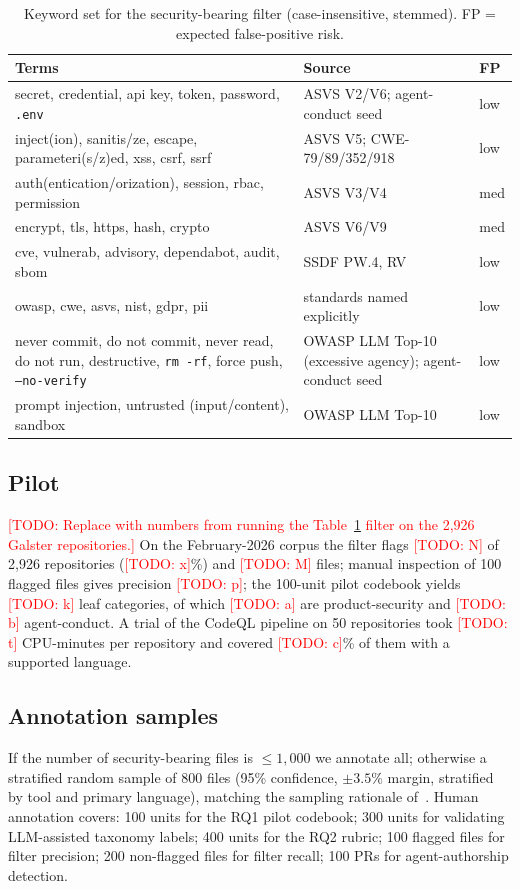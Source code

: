 \documentclass[10pt,conference]{IEEEtran}
\newcommand{\todo}[1]{\textcolor{red}{[TODO: #1]}}
\begin{document}
\begin{table}[t]
\caption{Keyword set for the security-bearing filter (case-insensitive, stemmed). FP = expected false-positive risk.}
\label{tab:keywords}
\centering\small
\begin{tabular}{p{3.6cm}p{2.6cm}p{0.9cm}}
\toprule
Terms & Source & FP \\
\midrule
secret, credential, api key, token, password, \texttt{.env} & ASVS V2/V6; agent-conduct seed & low \\
inject(ion), sanitis/ze, escape, parameteri(s/z)ed, xss, csrf, ssrf & ASVS V5; CWE-79/89/352/918 & low \\
auth(entication/orization), session, rbac, permission & ASVS V3/V4 & med \\
encrypt, tls, https, hash, crypto & ASVS V6/V9 & med \\
cve, vulnerab, advisory, dependabot, audit, sbom & SSDF PW.4, RV & low \\
owasp, cwe, asvs, nist, gdpr, pii & standards named explicitly & low \\
never commit, do not commit, never read, do not run, destructive, \texttt{rm -rf}, force push, \texttt{--no-verify} & OWASP LLM Top-10 (excessive agency); agent-conduct seed & low \\
prompt injection, untrusted (input/content), sandbox & OWASP LLM Top-10 & low \\
\bottomrule
\end{tabular}
\end{table}

\subsection{Pilot}
\todo{Replace with numbers from running the Table~\ref{tab:keywords} filter on the 2,926 Galster repositories.} On the February-2026 corpus the filter flags \todo{N} of 2,926 repositories (\todo{x}\%) and \todo{M} files; manual inspection of 100 flagged files gives precision \todo{p}; the 100-unit pilot codebook yields \todo{k} leaf categories, of which \todo{a} are product-security and \todo{b} agent-conduct. A trial of the CodeQL pipeline on 50 repositories took \todo{t} CPU-minutes per repository and covered \todo{c}\% of them with a supported language.

\subsection{Annotation samples}
If the number of security-bearing files is $\leq1,000$ we annotate all; otherwise a stratified random sample of 800 files (95\% confidence, $\pm3.5\%$ margin, stratified by tool and primary language), matching the sampling rationale of~\cite{lu2026modelcard}. Human annotation covers: 100 units for the RQ1 pilot codebook; 300 units for validating LLM-assisted taxonomy labels; 400 units for the RQ2 rubric; 100 flagged files for filter precision; 200 non-flagged files for filter recall; 100 PRs for agent-authorship detection.
\end{document}
